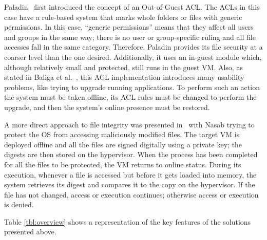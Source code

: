 \par Paladin~\cite{baliga2008automated} first introduced the concept of an Out-of-Guest \ac{ACL}. The \acp{ACL} in this case have a rule-based system that marks whole folders or files with generic permissions. In this case, ``generic permissions'' means that they affect all users and groups in the same way; there is no user or group-specific ruling and all file accesses fall in the same category. Therefore, Paladin provides its file security at a coarser level than the one desired. Additionally, it uses an in-guest module which, although relatively small and protected, still runs in the guest \ac{VM}. Also, as stated in Baliga et al.~\cite{baliga2008automated}, this \ac{ACL} implementation introduces many usability problems, like trying to upgrade running applications. To perform such an action the system must be taken offline, its \ac{ACL} rules must be changed to perform the upgrade, and then the system's online presence must be restored. 

\par A more direct approach to file integrity was presented in~\cite{nasab2012security} with Nasab trying to protect the \ac{OS} from accessing maliciously modified files. The target \ac{VM} is deployed offline and all the files are signed digitally using a private key; the digests are then stored on the hypervisor. When the process has been completed for all the files to be protected, the \ac{VM} returns to online status. During its execution, whenever a file is accessed but before it gets loaded into memory, the system retrieves its digest and compares it to the copy on the hypervisor. If the file has not changed, access or execution continues; otherwise access or execution is denied.

\par Table \ref{tbl:overview} shows a representation of the key features of the solutions presented above.

